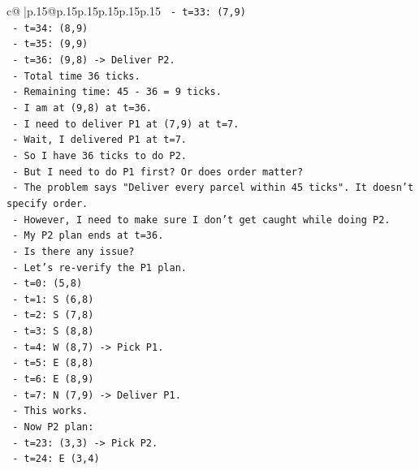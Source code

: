 \documentclass{article}
\begin{document}
{\begin{supertabular}{c@{$\;$}|p{.15\linewidth}@{}p{.15\linewidth}p{.15\linewidth}p{.15\linewidth}p{.15\linewidth}p{.15\linewidth}}
{{{\texttt{            {-}   t=33: (7,9)} \\
\texttt{            {-}   t=34: (8,9)} \\
\texttt{            {-}   t=35: (9,9)} \\
\texttt{            {-}   t=36: (9,8) {-}> Deliver P2.} \\
\texttt{            {-}   Total time 36 ticks.} \\
\texttt{            {-}   Remaining time: 45 {-} 36 = 9 ticks.} \\
\texttt{            {-}   I am at (9,8) at t=36.} \\
\texttt{            {-}   I need to deliver P1 at (7,9) at t=7.} \\
\texttt{            {-}   Wait, I delivered P1 at t=7.} \\
\texttt{            {-}   So I have 36 ticks to do P2.} \\
\texttt{            {-}   But I need to do P1 first? Or does order matter?} \\
\texttt{            {-}   The problem says "Deliver every parcel within 45 ticks". It doesn't specify order.} \\
\texttt{            {-}   However, I need to make sure I don't get caught while doing P2.} \\
\texttt{            {-}   My P2 plan ends at t=36.} \\
\texttt{            {-}   Is there any issue?} \\
\texttt{            {-}   Let's re{-}verify the P1 plan.} \\
\texttt{            {-}   t=0: (5,8)} \\
\texttt{            {-}   t=1: S (6,8)} \\
\texttt{            {-}   t=2: S (7,8)} \\
\texttt{            {-}   t=3: S (8,8)} \\
\texttt{            {-}   t=4: W (8,7) {-}> Pick P1.} \\
\texttt{            {-}   t=5: E (8,8)} \\
\texttt{            {-}   t=6: E (8,9)} \\
\texttt{            {-}   t=7: N (7,9) {-}> Deliver P1.} \\
\texttt{            {-}   This works.} \\
\texttt{            {-}   Now P2 plan:} \\
\texttt{            {-}   t=23: (3,3) {-}> Pick P2.} \\
\texttt{            {-}   t=24: E (3,4)} \\
}}}
\end{supertabular}}
\end{document}
